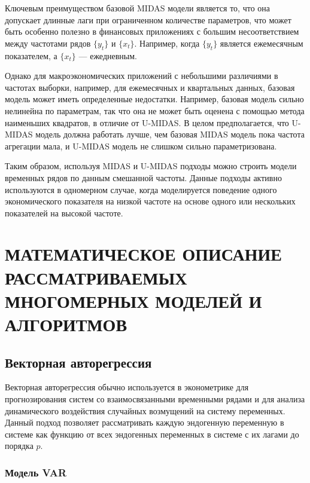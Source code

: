 \documentclass[a4paper, 14pt]{extreport}
\numberwithin{equation}{section}
\numberwithin{equation}{section}
\begin{document}
	Ключевым преимуществом базовой MIDAS модели является то, что она допускает длинные лаги при ограниченном количестве параметров, что может быть особенно полезно в финансовых приложениях с большим несоответствием между частотами рядов $\{y_t\}$ и $\{x_t\}$. Например, когда $\{y_t\}$ является ежемесячным показателем, а $\{x_t\}$ --- ежедневным. 
	
	Однако для макроэкономических приложений с небольшими различиями в частотах выборки, например, для ежемесячных и квартальных данных, базовая модель может иметь определенные недостатки. Например, базовая модель сильно нелинейна по параметрам, так что она не может быть оценена с помощью метода наименьших квадратов, в отличие от U-MIDAS. В целом предполагается, что U-MIDAS модель должна работать лучше, чем базовая MIDAS модель пока частота агрегации мала, и U-MIDAS модель не слишком сильно параметризована.
	
	Таким образом, используя MIDAS и U-MIDAS подходы можно строить модели временных рядов по данным смешанной частоты. Данные подходы активно используются в одномерном случае, когда моделируется поведение одного экономического показателя на низкой частоте на основе одного или нескольких показателей на высокой частоте.
	
	\chapter{МАТЕМАТИЧЕСКОЕ ОПИСАНИЕ РАССМАТРИВАЕМЫХ МНОГОМЕРНЫХ МОДЕЛЕЙ И АЛГОРИТМОВ}
	\label{chapter:2}
	
\section{Векторная авторегрессия}

	Векторная авторегрессия обычно используется в эконометрике для прогнозирования систем со взаимосвязанными
	временными рядами и для анализа динамического воздействия случайных возмущений на систему
	переменных. Данный подход позволяет 
	рассматривать каждую эндогенную переменную в системе как функцию от всех
	эндогенных переменных в системе с их лагами до порядка $p$.
	
	\subsection{Модель VAR}
	\label{subsec:var}
	
\end{document}
